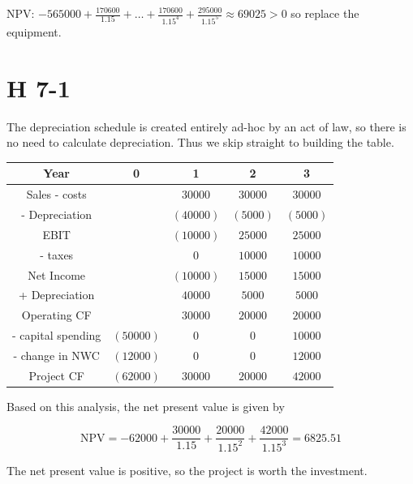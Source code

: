\documentclass[12pt, letterpaper, parskip = full]{article}
\begin{document}
    NPV: \( -565000 + \frac{170600}{1.15} + \dots + \frac{170600}{1.15^4} + \frac{295000}{1.15^5} \approx 69025 > 0\) so replace the equipment.

    \section{H 7-1}

    The depreciation schedule is created entirely ad-hoc by an act of law, so there is no need to calculate depreciation. Thus we skip straight to building the table.

    \begin{center}
	\begin{tabular}{|c|c|c|c|c|}
		\hline
		Year & 0 & 1 & 2 & 3 \\
		\hline
		Sales - costs & & \(30000\) & \(30000\) & \(30000\) \\
        \hline
        - Depreciation & & \((40000)\) & \((5000)\) & \((5000)\) \\
        \hline
        \hline
        EBIT & & \((10000)\) & \(25000\) & \(25000\) \\
        \hline
        - taxes & & \(0\) & \( 10000 \) & \(10000\) \\
        \hline
        \hline
        Net Income & & \((10000)\) & \(15000\) & \(15000\) \\
        \hline
        + Depreciation & & \(40000\) & \(5000\) & \(5000\) \\
        \hline
        \hline
        Operating CF & & \(30000\) & \(20000\) & \(20000\) \\
        \hline
        - capital spending & \((50000)\) & \(0\) & \(0\) & \(10000\) \\
        \hline
        - change in NWC & \((12000)\) & \(0\) & \(0\) &  \(12000\) \\
        \hline
        \hline
        Project CF & \((62000)\) & \(30000\) & \(20000\) & \(42000\) \\
        \hline
	\end{tabular}
	\end{center}

    Based on this analysis, the net present value is given by

    \[ \text{NPV} = -62000 + \frac{30000}{1.15} + \frac{20000}{1.15^2} + \frac{42000}{1.15^3} = 6825.51    \]

    The net present value is positive, so the project is worth the investment.
\end{document}
